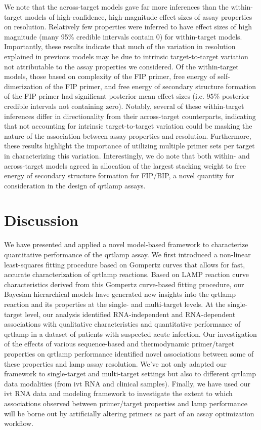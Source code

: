 \documentclass[../thesis.tex]{subfiles}
\begin{document}
We note that the across-target models gave far more inferences than the within-target models of high-confidence, high-magnitude effect sizes of assay properties on resolution. Relatively few properties were inferred to have effect sizes of high magnitude (many 95\% credible intervals contain 0) for within-target models. Importantly, these results indicate that much of the variation in resolution explained in previous models may be due to intrinsic target-to-target variation not attributable to the assay properties we considered. Of the within-target models, those based on complexity of the FIP primer, free energy of self-dimerization of the FIP primer, and free energy of secondary structure formation of the FIP primer had significant posterior mean effect sizes (i.e. 95\% posterior credible intervals not containing zero). Notably, several of these within-target inferences differ in directionality from their across-target counterparts, indicating that not accounting for intrinsic target-to-target variation could be masking the nature of the association between assay properties and resolution. Furthermore, these results highlight the importance of utilizing multiple primer sets per target in characterizing this variation. Interestingly, we do note that both within- and across-target models agreed in allocation of the largest stacking weight to free energy of secondary structure formation for FIP/BIP, a novel quantity for consideration in the design of \gls{qrtlamp} assays.


\section{Discussion \label{sec:discussion}}
We have presented and applied a novel model-based framework to characterize quantitative performance of the \gls{qrtlamp} assay. We first introduced a non-linear least-squares fitting procedure based on Gompertz curves that allows for fast, accurate characterization of \gls{qrtlamp} reactions. Based on LAMP reaction curve characteristics derived from this Gompertz curve-based fitting procedure, our Bayesian hierarchical models  have generated new insights into the \gls{qrtlamp} reaction and its properties at the single- and multi-target levels. At the single-target level, our analysis identified RNA-independent and RNA-dependent associations with qualitative characteristics and quantitative performance of \gls{qrtlamp} in a dataset of patients with suspected acute infection. Our investigation of the effects of various sequence-based and thermodynamic primer/target properties on \gls{qrtlamp} performance identified novel associations between some of these properties and \gls{lamp} assay resolution. We've not only adapted our framework to single-target and multi-target settings but also to different \gls{qrtlamp} data modalities (from \gls{ivt} RNA and clinical samples). Finally, we have used our \gls{ivt} RNA data and modeling framework to investigate the extent to which associations observed between primer/target properties and \gls{lamp} performance will be borne out by artificially altering primers as part of an assay optimization workflow. 
\end{document}
